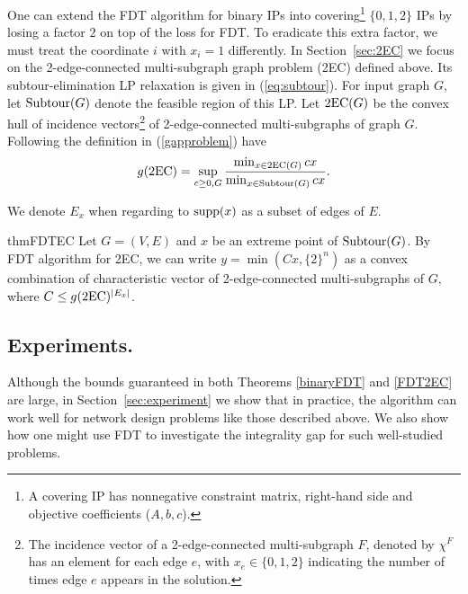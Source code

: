 One can extend the FDT algorithm for binary IPs into covering\footnote{A covering IP has nonnegative constraint matrix, right-hand side and objective coefficients ($A,b,c$).} $\{0,1,2\}$ IPs by losing a factor $2$ on top of the loss for FDT. To eradicate this extra factor, we must treat the coordinate $i$ with $x_i=1$ differently. In Section~\ref{sec:2EC} we focus on the 2-edge-connected multi-subgraph graph problem (2EC) defined above.  Its subtour-elimination LP relaxation is given in (\ref{eq:subtour}).
For input graph $G$, let $\operatorname{{Subtour}}(G)$ denote the feasible region of this LP. Let $\2ec(G)$ be the convex hull of incidence vectors\footnote{The incidence vector of a 2-edge-connected multi-subgraph $F$, denoted by $\chi^F$ has an element for each edge $e$, with $x_e \in \{0,1,2\}$ indicating the number of times edge $e$ appears in the solution.} of 2-edge-connected multi-subgraphs of graph $G$. Following the definition in (\ref{gapproblem}) have
\begin{equation}
g(\2ec) = \sup_{c\geq 0 , G}\frac{\min_{x\in \2ec(G)} cx}{\min_{x\in \subtour(G)} cx}.
\end{equation}

We denote $E_x$ when regarding to $\operatorname{supp}(x)$ as a subset of edges of $E$.

\begin{restatable}{thm}{FDTEC}
	\label{FDT2EC}
	Let $G=(V,E)$ and $x$ be an extreme point of  $\operatorname{{Subtour}}(G)$. By FDT algorithm for 2EC, we can write $y= \min(Cx,\{2\}^n)$ as a convex combination of characteristic vector of 2-edge-connected multi-subgraphs of $G$, where $C\leq g(\2ec)^{|E_x|}$.
\end{restatable}

\subsection{Experiments.} Although the bounds guaranteed in both Theorems \ref{binaryFDT} and \ref{FDT2EC} are large, in Section~\ref{sec:experiment} we show that in practice, the algorithm can work well for network design problems like those described above. We also show how one might use FDT to investigate the integrality gap for such well-studied problems.




